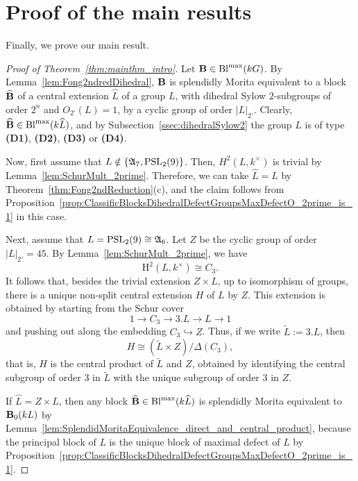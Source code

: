 




\section{Proof of the main results}\label{sec:proof_Main_Thm}\label{sec:proofs}%

Finally, we prove our main result.

\begin{proof}[Proof of Theorem~\ref{thm:mainthm_intro}]
Let ${\mathbf{B}}\in\operatorname{Bl}^{\mathrm{max}}(kG)$. By Lemma~\ref{lem:Fong2ndredDihedral}, ${\mathbf{B}}$ is splendidly Morita equivalent to a block $\widehat{{\mathbf{B}}}$ of a central extension $\widehat{L}$  of a group \(L\), with dihedral Sylow \(2\)-subgroups of order \(2^n\) and \(O_{2'}(L)=1\), by a cyclic group of order $|L|_{2'}$. Clearly, $\widehat{{\mathbf{B}}}\in\operatorname{Bl}^{\mathrm{max}}(k\widehat{L})$, and by Subsection~\ref{ssec:dihedralSylow2} the group $L$ is of type {\bf(D1)}, {\bf(D2)}, {\bf(D3)} or {\bf(D4)}. 
\par
Now, first assume that $L\notin\{\mathfrak{A}_7, \operatorname{PSL}_2(9)\}$. Then, $H^2(L,k^\times)$ is trivial by Lemma~\ref{lem:SchurMult_2prime}. Therefore, we can take $\widehat{L}=L$ by Theorem~\ref{thm:Fong2ndReduction}(c), and the claim follows from Proposition~\ref{prop:ClassificBlocksDihedralDefectGroupsMaxDefectO_2prime_is_1} in this case. 
\par 
Next, assume that  $L=\operatorname{PSL}_2(9)\cong{\mathfrak{A}}_6$. 
Let $Z$ be the cyclic
group of order $|L|_{2'}=45$. By Lemma~\ref{lem:SchurMult_2prime}, we have
\[
{\mathrm H}^2(L,k^\times)\cong C_3.
\]
It follows that, besides the trivial extension $Z\times L$, 
up to isomorphism of groups, there is a unique non-split central
extension $H$ of $L$ by $Z$. This extension is obtained by starting from the Schur
cover
\[
1\longrightarrow C_3\longrightarrow 3.L\longrightarrow L\longrightarrow 1
\]
and pushing out along the embedding $C_3\hookrightarrow Z$. Thus, if we write
$\widetilde{L}:=3.L$, then
\[
H\cong (\widetilde{L}\times Z)/\Delta(C_3),
\]
that is, $H$ is the central product of $\widetilde{L}$ and $Z$, obtained by
identifying the central subgroup of order $3$ in $\widetilde{L}$ with the unique
subgroup of order $3$ in $Z$.
\par
If $\widehat{L}=Z\times L$, then any block $\widehat{{\mathbf{B}}}\in\operatorname{Bl}^{\mathrm{max}}(k\widehat{L})$ is splendidly Morita equivalent to ${\mathbf{B}}_0(kL)$ by Lemma~\ref{lem:SplendidMoritaEquivalence_direct_and_central_product}, because the principal block of $L$ is the unique block of maximal defect of $L$ by Proposition~\ref{prop:ClassificBlocksDihedralDefectGroupsMaxDefectO_2prime_is_1}.

\end{proof}
